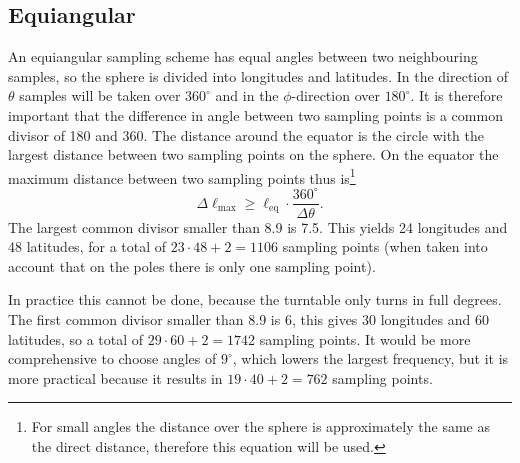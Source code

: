 \subsection{Equiangular}
\label{ssec:equiangular}
An equiangular sampling scheme has equal angles between two neighbouring samples, so the sphere is divided into longitudes and latitudes.
In the direction of $\theta$ samples will be taken over $360^\circ$ and in the $\phi$-direction over $180^\circ$.
It is therefore important that the difference in angle between two sampling points is a common divisor of 180 and 360.
The distance around the equator is the circle with the largest distance between two sampling points on the sphere. 
On the equator the maximum distance between two sampling points thus is\footnote{For small angles the distance over the sphere is approximately the same as the direct distance, therefore this equation will be used.} 
\begin{equation*}
\Delta\ell_\text{max}\geq\ell_\text{eq}\cdot\dfrac{360^\circ}{\Delta\theta}.
\end{equation*}
The largest common divisor smaller than 8.9 is 7.5.
This yields 24 longitudes and 48 latitudes, for a total of $23\cdot 48+2=1106$ sampling points (when taken into account that on the poles there is only one sampling point).

In practice this cannot be done, because the turntable only turns in full degrees.
The first common divisor smaller than 8.9 is 6, this gives 30 longitudes and 60 latitudes, so a total of $29\cdot60+2=1742$ sampling points.
It would be more comprehensive to choose angles of $9^\circ$, which lowers the largest frequency, but it is more practical because it results in $19\cdot 40+2=762$ sampling points.

